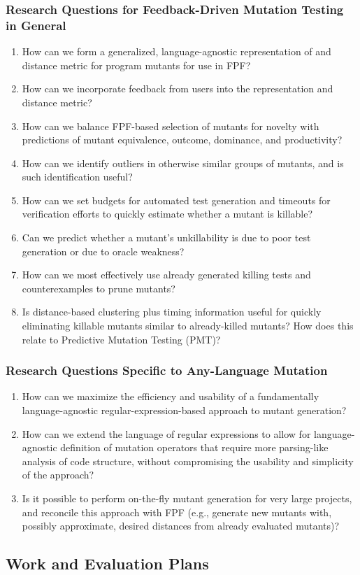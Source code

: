 \subsubsection{Research Questions for Feedback-Driven Mutation Testing
in General}

\begin{enumerate}
\item How can we form a generalized, language-agnostic representation
  of and distance metric for program mutants for use in FPF?
\item How can we incorporate feedback from users into the
  representation and distance metric?
\item How can we balance FPF-based selection of mutants for novelty
  with predictions of mutant equivalence, outcome, dominance, and
  productivity?
\item How can we identify outliers in otherwise similar groups of
  mutants, and is such identification useful?
\item How can we set budgets for automated test generation and
  timeouts for verification efforts to quickly estimate whether a
  mutant is killable?
\item Can we predict whether a mutant's unkillability is due to poor test 
  generation  or due to oracle weakness? 
\item How can we most effectively use already generated killing tests
  and counterexamples to prune mutants?
\item Is distance-based clustering plus timing information useful for quickly
  eliminating killable mutants similar to already-killed mutants?  How
  does this relate to Predictive Mutation Testing (PMT)?

\end{enumerate}

\subsubsection{Research Questions Specific to Any-Language Mutation}

\begin{enumerate}
\item How can we maximize the efficiency and usability of a
  fundamentally language-agnostic regular-expression-based approach to
  mutant generation?
\item How can we extend the language of regular expressions to allow
  for language-agnostic definition of mutation operators that require
  more parsing-like analysis of code structure, without compromising
  the usability and simplicity of the approach?
\item Is it possible to perform on-the-fly mutant generation for very
  large projects, and reconcile this approach with FPF (e.g., generate
  new mutants with, possibly approximate, desired distances from
  already evaluated mutants)?
\end{enumerate}

\subsection{Work and Evaluation Plans}
\label{sec:workplan}

